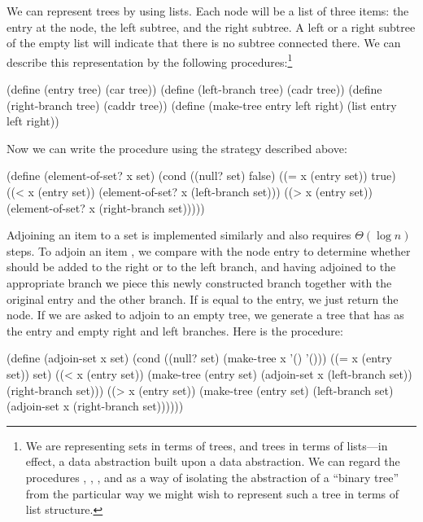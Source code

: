 We can represent trees by using lists.  Each node will be a list of three
items: the entry at the node, the left subtree, and the right subtree.  A left
or a right subtree of the empty list will indicate that there is no subtree
connected there.  We can describe this representation by the following
procedures:\footnote{We are representing sets in terms of trees, and trees in
terms of lists---in effect, a data abstraction built upon a data abstraction.
We can regard the procedures , ,
, and  as a way of isolating the abstraction
of a ``binary tree'' from the particular way we might wish to represent such a
tree in terms of list structure.}

\begin{codeBlock}
(define (entry tree) (car tree))
(define (left-branch tree) (cadr tree))
(define (right-branch tree) (caddr tree))
(define (make-tree entry left right)
  (list entry left right))
\end{codeBlock}

\noindent
Now we can write the  procedure using the strategy
described above:

\begin{codeBlock}
(define (element-of-set? x set)
  (cond ((null? set) false)
        ((= x (entry set)) true)
        ((< x (entry set))
         (element-of-set? x (left-branch set)))
        ((> x (entry set))
         (element-of-set? x (right-branch set)))))
\end{codeBlock}

\noindent
Adjoining an item to a set is implemented similarly and also requires
\( \Theta(\log n) \) steps.  To adjoin an item , we compare
 with the node entry to determine whether  should be added to
the right or to the left branch, and having adjoined  to the
appropriate branch we piece this newly constructed branch together with the
original entry and the other branch.  If  is equal to the entry, we
just return the node.  If we are asked to adjoin  to an empty tree, we
generate a tree that has  as the entry and empty right and left
branches.  Here is the procedure:

\begin{codeBlock}
(define (adjoin-set x set)
  (cond ((null? set) (make-tree x '() '()))
        ((= x (entry set)) set)
        ((< x (entry set))
         (make-tree (entry set)
                    (adjoin-set x (left-branch set))
                    (right-branch set)))
        ((> x (entry set))
         (make-tree (entry set) (left-branch set)
                    (adjoin-set x (right-branch set))))))
\end{codeBlock}


